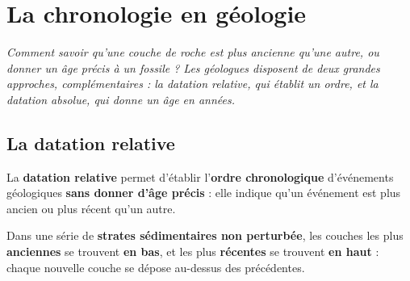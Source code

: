 \chapter{La chronologie en géologie}

\noindent\textit{Comment savoir qu'une couche de roche est plus ancienne qu'une autre, ou
donner un âge précis à un fossile ? Les géologues disposent de deux grandes approches,
complémentaires : la datation relative, qui établit un ordre, et la datation absolue, qui
donne un âge en années.}
\vspace{8pt}

\connecteBanner

\section{La datation relative}

\begin{definition}
La \textbf{datation relative} permet d'établir l'\textbf{ordre chronologique} d'événements
géologiques \textbf{sans donner d'âge précis} : elle indique qu'un événement est plus
ancien ou plus récent qu'un autre.
\end{definition}

\begin{propriete}
Dans une série de \textbf{strates sédimentaires non perturbée}, les couches les plus
\textbf{anciennes} se trouvent \textbf{en bas}, et les plus \textbf{récentes} se trouvent
\textbf{en haut} : chaque nouvelle couche se dépose au-dessus des précédentes.
\end{propriete}

\begin{illus}
\end{illus}


